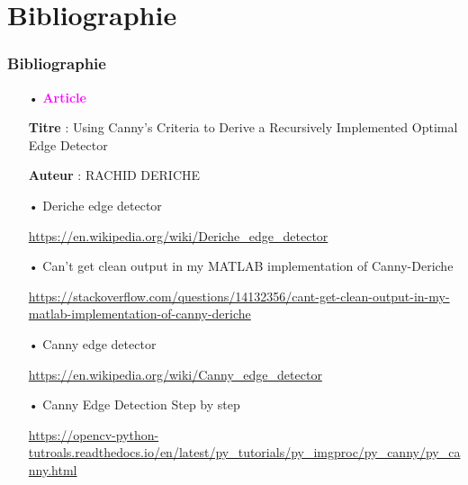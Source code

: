 \documentclass{beamer}
\begin{document}
\section{Bibliographie}
\begin{frame}
\frametitle{Bibliographie}
	
\begin{itemize}

\item[•] \textbf{\textcolor{magenta}{Article}}
\item[] \textbf{Titre} : Using Canny's Criteria to Derive a Recursively Implemented Optimal Edge
Detector
\item[] \textbf{Auteur} : RACHID DERICHE
\item[]

\item[•] Deriche edge detector
\item[] \url{https://en.wikipedia.org/wiki/Deriche_edge_detector} 

\item[•] Can't get clean output in my MATLAB implementation of Canny-Deriche
\item[] \url{https://stackoverflow.com/questions/14132356/cant-get-clean-output-in-my-matlab-implementation-of-canny-deriche} 

\item[•] Canny edge detector
\item[] \url{https://en.wikipedia.org/wiki/Canny_edge_detector} 

\item[•] Canny Edge Detection Step by step
\item[] \url{https://opencv-python-tutroals.readthedocs.io/en/latest/py_tutorials/py_imgproc/py_canny/py_canny.html} 

\end{itemize}
\end{frame}
\end{document}
